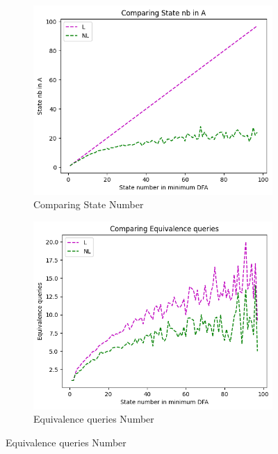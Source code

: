 \begin{figure}[!htb]
  \centering
  \begin{subfigure}[b]{0.3\textwidth}
    \includegraphics[width=\textwidth]{../statistics/plots/BenchMark/State nb in A.png}
    \caption{Comparing State Number}
    \label{fig:StateBenchMarkCompare}
  \end{subfigure}
  \begin{subfigure}[b]{0.3\textwidth}
    \includegraphics[width=\textwidth]{../statistics/plots/BenchMark/Equivalence queries.png}
    \caption{Equivalence queries Number}
    \label{fig:EquivBenchMarkCompare}
  \end{subfigure}

\end{figure}
